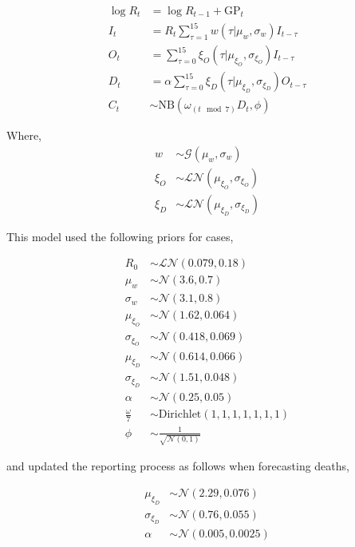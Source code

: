 \documentclass[
]{article}
\begin{document}
\begin{align*}
  \log R_{t} &= \log R_{t-1} + \mathrm{GP}_t \\
  I_t &= R_t \sum_{\tau = 1}^{15} w(\tau | \mu_{w}, \sigma_{w}) I_{t - \tau} \\
  O_t &= \sum_{\tau = 0}^{15} \xi_{O}(\tau | \mu_{\xi_{O}}, \sigma_{\xi_{O}}) I_{t-\tau} \\
  D_t &= \alpha \sum_{\tau = 0}^{15} \xi_{D}(\tau | \mu_{\xi_{D}}, \sigma_{\xi_{D}}) O_{t-\tau} \\ 
  C_t &\sim \mathrm{NB}\left(\omega_{(t \mod 7)}D_t, \phi\right)
\end{align*}

Where,
\begin{align*}
     w &\sim \mathcal{G}(\mu_{w}, \sigma_{w}) \\
    \xi_{O} &\sim \mathcal{LN}(\mu_{\xi_{O}}, \sigma_{\xi_{O}}) \\
    \xi_{D} &\sim \mathcal{LN}(\mu_{\xi_{D}}, \sigma_{\xi_{D}}) 
\end{align*}

This model used the following priors for cases,

\begin{align*}
     R_0 &\sim \mathcal{LN}(0.079, 0.18) \\
    \mu_w &\sim \mathcal{N}(3.6, 0.7) \\
    \sigma_w &\sim \mathcal{N}(3.1, 0.8) \\
    \mu_{\xi_{O}} &\sim \mathcal{N}(1.62, 0.064) \\
    \sigma_{\xi_{O}} &\sim \mathcal{N}(0.418, 0.069) \\
    \mu_{\xi_{D}} &\sim \mathcal{N}(0.614, 0.066) \\
    \sigma_{\xi_{D}} &\sim \mathcal{N}(1.51, 0.048) \\
    \alpha &\sim \mathcal{N}(0.25, 0.05) \\
    \frac{\omega}{7} &\sim \mathrm{Dirichlet}(1, 1, 1, 1, 1, 1, 1) \\
    \phi &\sim \frac{1}{\sqrt{\mathcal{N}(0, 1)}}
\end{align*}

and updated the reporting process as follows when forecasting deaths,

\begin{align*}
    \mu_{\xi_{D}} &\sim \mathcal{N}(2.29, 0.076) \\
    \sigma_{\xi_{D}} &\sim \mathcal{N}(0.76, 0.055) \\
    \alpha &\sim \mathcal{N}(0.005, 0.0025) 
\end{align*}
\end{document}
